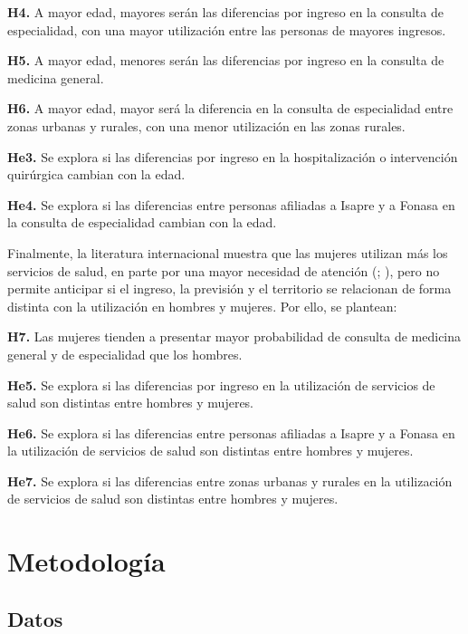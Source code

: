 \documentclass[
  spanish,
  a4paper,
  oneside]{scrbook}
\begin{document}
\textbf{H4.} A mayor edad, mayores serán las diferencias por ingreso en
la consulta de especialidad, con una mayor utilización entre las
personas de mayores ingresos.

\textbf{H5.} A mayor edad, menores serán las diferencias por ingreso en
la consulta de medicina general.

\textbf{H6.} A mayor edad, mayor será la diferencia en la consulta de
especialidad entre zonas urbanas y rurales, con una menor utilización en
las zonas rurales.

\textbf{He3.} Se explora si las diferencias por ingreso en la
hospitalización o intervención quirúrgica cambian con la edad.

\textbf{He4.} Se explora si las diferencias entre personas afiliadas a
Isapre y a Fonasa en la consulta de especialidad cambian con la edad.

Finalmente, la literatura internacional muestra que las mujeres utilizan
más los servicios de salud, en parte por una mayor necesidad de atención
(;
), pero no permite anticipar si el ingreso, la previsión y el
territorio se relacionan de forma distinta con la utilización en hombres
y mujeres. Por ello, se plantean:

\textbf{H7.} Las mujeres tienden a presentar mayor probabilidad de
consulta de medicina general y de especialidad que los hombres.

\textbf{He5.} Se explora si las diferencias por ingreso en la
utilización de servicios de salud son distintas entre hombres y mujeres.

\textbf{He6.} Se explora si las diferencias entre personas afiliadas a
Isapre y a Fonasa en la utilización de servicios de salud son distintas
entre hombres y mujeres.

\textbf{He7.} Se explora si las diferencias entre zonas urbanas y
rurales en la utilización de servicios de salud son distintas entre
hombres y mujeres.


\chapter{Metodología}\label{metodologuxeda}

\section{Datos}\label{datos}
\end{document}
